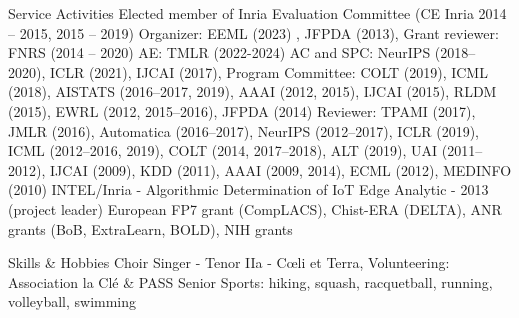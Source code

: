 \documentclass{resume}
\begin{document}
\begin{category}{Service Activities}
\setlength\itemsep{0.15em}
\citembullet Elected member of Inria Evaluation Committee (CE Inria 2014 -- 2015, 2015 -- 2019)
\citembullet Organizer: EEML (2023) , JFPDA (2013),  Grant reviewer: FNRS (2014 -- 2020)
\citembullet AE: TMLR (2022-2024) AC and SPC: NeurIPS (2018--2020), ICLR (2021),  IJCAI (2017), Program Committee: COLT (2019), ICML (2018), AISTATS (2016--2017, 2019), AAAI (2012, 2015), IJCAI (2015), RLDM (2015), EWRL 
(2012, 2015--2016), JFPDA (2014)
\citembullet  Reviewer: TPAMI (2017), JMLR (2016), Automatica (2016--2017), NeurIPS (2012--2017), ICLR (2019), ICML (2012--2016, 2019), COLT
(2014, 2017--2018), ALT (2019), UAI (2011--2012), IJCAI (2009), KDD (2011), AAAI (2009, 2014), ECML
(2012), MEDINFO (2010)
\citembullet INTEL/Inria - Algorithmic Determination of IoT Edge Analytic -
2013 (project leader)
\citembullet  European FP7 grant (CompLACS), Chist-ERA (DELTA), ANR grants (BoB, ExtraLearn, BOLD), NIH grants
\end{category}


%

\vspace{-0.5cm}
\begin{category}{Skills \& Hobbies}
\setlength\itemsep{0.1em}
\citembullet Choir Singer - Tenor IIa - C\oe li et Terra, Volunteering: Association la Cl\' e \& 
PASS Senior
\citembullet Sports: hiking, squash, racquetball, running, volleyball, swimming
\end{category}


\end{document}
